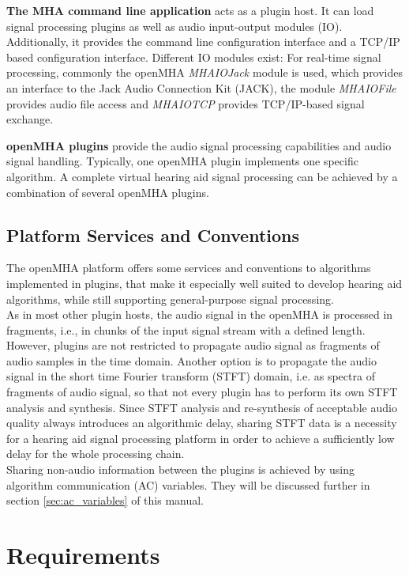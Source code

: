 \documentclass[11pt,a4paper,twoside]{article}
\newcommand{\+}{\discretionary{\mbox{\scriptsize$\hookleftarrow$}}{}{}}
\begin{document}
{\bf The MHA command line application} acts as a plugin host. It can
load signal processing plugins as well as audio input-output modules
(IO). Additionally, it provides the command line configuration
interface and a TCP/IP based configuration interface. Different IO
modules exist: For real-time signal processing, commonly the openMHA
\emph{MHAIOJack} module is used, which
provides an interface to the Jack Audio Connection Kit (JACK), the
module \emph{MHAIOFile} provides audio file access and \emph{MHAIOTCP}
provides TCP/IP-based signal exchange.

{\bf openMHA plugins} provide the audio signal processing capabilities
and audio signal handling. Typically, one openMHA plugin implements
one specific algorithm. A complete virtual hearing aid signal
processing can be achieved by a combination of several openMHA
plugins.
\subsection{Platform Services and Conventions}\label{index_pltf}
The openMHA platform offers some services and conventions to
algorithms implemented in plugins, that make it especially well suited
to develop hearing aid algorithms, while still supporting
general-purpose signal processing.\\ As in most other plugin hosts,
the audio signal in the openMHA is processed in fragments, i.e., in
chunks of the input signal stream with a defined length. However,
plugins are not restricted to propagate audio signal as fragments of
audio samples in the time domain. Another option is to propagate the
audio signal in the short time Fourier transform (STFT) domain,
i.e. as spectra of fragments of audio signal, so that not every plugin
has to perform its own STFT analysis and synthesis. Since STFT
analysis and re-synthesis of acceptable audio quality always
introduces an algorithmic delay, sharing STFT data is a necessity for
a hearing aid signal processing platform in order to achieve a
sufficiently low delay for the whole processing chain.\\ Sharing
non-audio information between the plugins is achieved by using
algorithm communication (AC) variables. They will be discussed further
in section \ref{sec:ac_variables} of this manual.



\section{Requirements}
\end{document}
